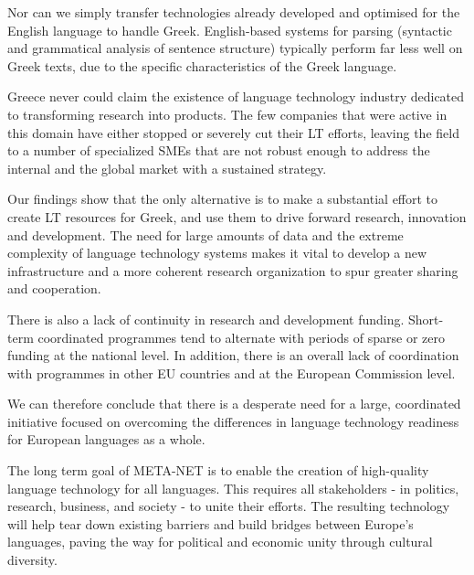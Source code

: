 \documentclass[]{../../metanetpaper}
\begin{document}
\begin{multicols}{2}
Nor can we simply transfer technologies already developed and optimised for the English language to handle Greek. English-based systems for parsing (syntactic and grammatical analysis of sentence structure) typically perform far less well on Greek texts, due to the specific characteristics of the Greek language.

Greece never could claim the existence of language technology industry dedicated to transforming research into products. The few companies that were active in this domain have either stopped or severely cut their LT efforts, leaving the field to a number of specialized SMEs that are not robust enough to address the internal and the global market with a sustained strategy. 

Our findings show that the only alternative is to make a substantial effort to create LT resources for Greek, and use them to drive forward research, innovation and development. The need for large amounts of data and the extreme complexity of language technology systems makes it vital to develop a new infrastructure and a more coherent research organization to spur greater sharing and cooperation.

There is also a lack of continuity in research and development funding. Short-term coordinated programmes tend to alternate with periods of sparse or zero funding at the national level. In addition, there is an overall lack of coordination with programmes in other EU countries and at the European Commission level.

We can therefore conclude that there is a desperate need for a large, coordinated initiative focused on overcoming the differences in language technology readiness for European languages as a whole.

The long term goal of META-NET is to enable the creation of high-quality language technology for all languages. This requires all stakeholders - in politics, research, business, and society - to unite their efforts. The resulting technology will help tear down existing barriers and build bridges between Europe’s languages, paving the way for political and economic unity through cultural diversity. 
\end{multicols}

\clearpage
\end{document}
